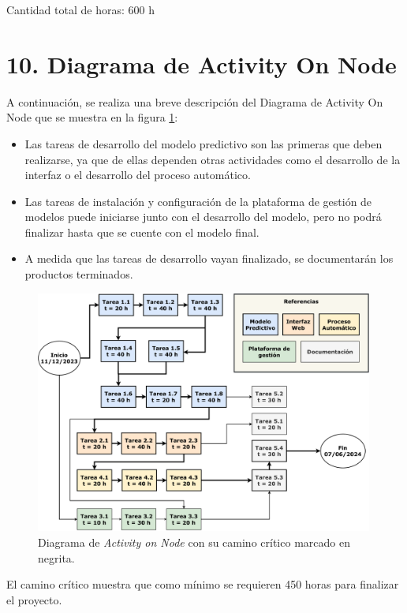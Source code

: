 \documentclass[
11pt, %
]{charter}
\begin{document}
Cantidad total de horas: 600 h

\section{10. Diagrama de Activity On Node}
\label{sec:AoN}

A continuación, se realiza una breve descripción del Diagrama de Activity On Node que se muestra en la figura \ref{fig:AoN}:

\begin{itemize}
	\item Las tareas de desarrollo del modelo predictivo son las primeras que deben realizarse, ya que de ellas dependen otras actividades como el desarrollo de la interfaz o el desarrollo del proceso automático. 
	\item Las tareas de instalación y configuración de la plataforma de gestión de modelos puede iniciarse junto con el desarrollo del modelo, pero no podrá finalizar hasta que se cuente con el modelo final.
	\item A medida que las tareas de desarrollo vayan finalizado, se documentarán los productos terminados.
\end{itemize}

\begin{figure}[htpb]
\centering 
\includegraphics[width=0.99\textwidth]{./Figuras/AoN_Extendido.pdf}
\caption{Diagrama de \textit{Activity on Node} con su camino crítico marcado en negrita.}
\label{fig:AoN}
\end{figure}

El camino crítico muestra que como mínimo se requieren 450 horas para finalizar el proyecto.
\end{document}
